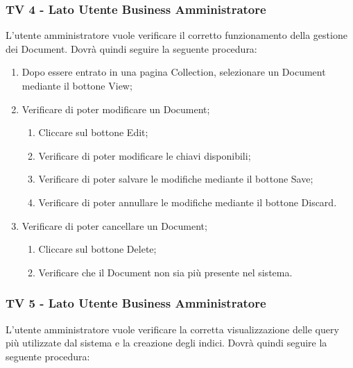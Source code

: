 \subsubsection{TV 4 - Lato Utente Business Amministratore}

L’utente amministratore vuole verificare il corretto funzionamento della gestione dei Document.
Dovrà quindi seguire la seguente procedura:


\begin{enumerate}
\item Dopo essere entrato in una pagina Collection, selezionare un Document mediante il bottone View;
\item Verificare di poter modificare un Document;
\begin{enumerate}
\item Cliccare sul bottone Edit;
\item Verificare di poter modificare le chiavi disponibili;
\item Verificare di poter salvare le modifiche mediante il bottone Save;
\item Verificare di poter annullare le modifiche mediante il bottone Discard.
\end{enumerate}
\item Verificare di poter cancellare un Document;
\begin{enumerate}
\item Cliccare sul bottone Delete;
\item Verificare che il Document non sia più presente nel sistema.
\end{enumerate}
\end{enumerate}


\subsubsection{TV 5 - Lato Utente Business Amministratore}
L’utente amministratore vuole verificare la corretta visualizzazione delle query più utilizzate dal sistema e la creazione degli indici.
Dovrà quindi seguire la seguente procedura:

